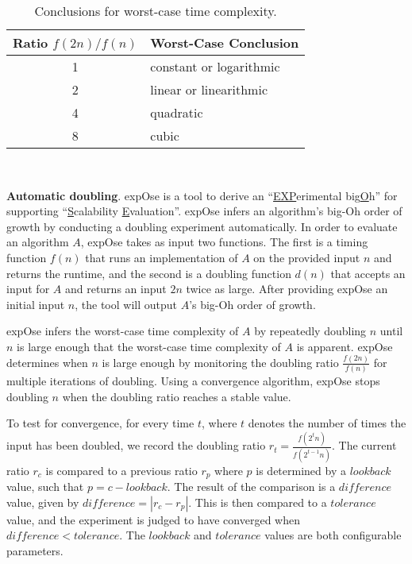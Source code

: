 \documentclass[10pt,twocolumn]{article}
\newcommand{\toolname}{{\sc expOse}\xspace}
\begin{document}
\begin{table}[h!]
  \vspace*{-.10in}
  \begin{center}
    \begin{tabular}{c|l}
      Ratio $f(2n)/f(n)$ & Worst-Case Conclusion              \\ \hline
      1                  & constant or logarithmic \\
      2                  & linear or linearithmic  \\
      4                  & quadratic               \\
      8                  & cubic                   \\
    \end{tabular}
  \end{center}
  \vspace*{-.25in}

  \caption{Conclusions for worst-case time complexity.}~\label{table:ratios}
  \vspace*{-.30in}

\end{table}

{\bf Automatic doubling}.
    \toolname \cite{kinneer2015,tool} is a tool to derive an
    ``\underline{EXP}erimental big\underline{O}h'' for supporting
    ``\underline{S}calability \underline{E}valuation''.
    \toolname infers an algorithm's big-Oh order of growth by
    conducting a doubling experiment automatically.  In order to
    evaluate an algorithm $A$, \toolname takes as input two
    functions. The first is a timing function $f(n)$ that runs an
    implementation of $A$ on the provided input $n$ and returns
    the runtime, and the second is a doubling function $d(n)$ that
    accepts an input for $A$ and returns an input $2n$ twice as
    large. After providing \toolname an initial input $n$, the tool
    will output $A$'s big-Oh order of growth.

    \toolname infers the worst-case time complexity of $A$ by
    repeatedly doubling $n$ until $n$ is large enough that the
    worst-case time complexity of $A$ is apparent.  \toolname
    determines when $n$ is large enough by monitoring the doubling
    ratio $\frac{f(2n)}{f(n)}$ for multiple iterations of doubling.
    Using a convergence algorithm, \toolname stops doubling $n$
    when the doubling ratio reaches a stable value.
   
  To test for convergence, for every time $t$, where $t$ denotes the number of times the input has been doubled, we
  record the doubling ratio $r_t = \frac{f(2^t n)}{f(2^{t-1}n)}$. The current ratio $r_c$ is compared to a previous
  ratio $r_p$ where $p$ is determined by a $\mathit{lookback}$ value, such that $p=c-\mathit{lookback}$.  The result of
  the comparison is a $\mathit{difference}$ value, given by $\mathit{difference} = |r_c - r_p|$.  This is then compared
  to a $\mathit{tolerance}$ value, and the experiment is judged to have converged when $\mathit{difference}<\mathit{tolerance}$.
  The $\mathit{lookback}$ and $\mathit{tolerance}$ values are both configurable parameters.
\end{document}
